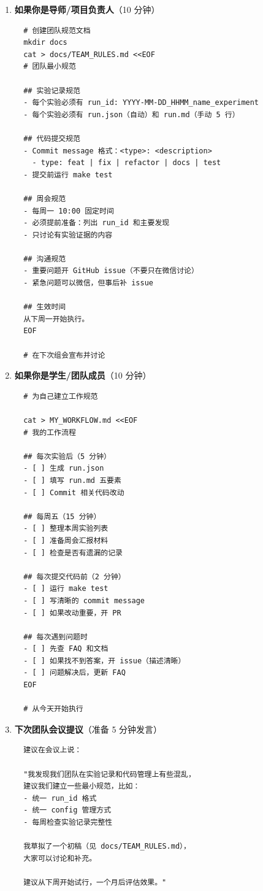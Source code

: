 \begin{enumerate}
  \item \textbf{如果你是导师/项目负责人}（10 分钟）

  \begin{verbatim}
  # 创建团队规范文档
  mkdir docs
  cat > docs/TEAM_RULES.md <<EOF
  # 团队最小规范

  ## 实验记录规范
  - 每个实验必须有 run_id: YYYY-MM-DD_HHMM_name_experiment
  - 每个实验必须有 run.json（自动）和 run.md（手动 5 行）

  ## 代码提交规范
  - Commit message 格式：<type>: <description>
    - type: feat | fix | refactor | docs | test
  - 提交前运行 make test

  ## 周会规范
  - 每周一 10:00 固定时间
  - 必须提前准备：列出 run_id 和主要发现
  - 只讨论有实验证据的内容

  ## 沟通规范
  - 重要问题开 GitHub issue（不要只在微信讨论）
  - 紧急问题可以微信，但事后补 issue

  ## 生效时间
  从下周一开始执行。
  EOF

  # 在下次组会宣布并讨论
  \end{verbatim}

  \item \textbf{如果你是学生/团队成员}（10 分钟）

  \begin{verbatim}
  # 为自己建立工作规范

  cat > MY_WORKFLOW.md <<EOF
  # 我的工作流程

  ## 每次实验后（5 分钟）
  - [ ] 生成 run.json
  - [ ] 填写 run.md 五要素
  - [ ] Commit 相关代码改动

  ## 每周五（15 分钟）
  - [ ] 整理本周实验列表
  - [ ] 准备周会汇报材料
  - [ ] 检查是否有遗漏的记录

  ## 每次提交代码前（2 分钟）
  - [ ] 运行 make test
  - [ ] 写清晰的 commit message
  - [ ] 如果改动重要，开 PR

  ## 每次遇到问题时
  - [ ] 先查 FAQ 和文档
  - [ ] 如果找不到答案，开 issue（描述清晰）
  - [ ] 问题解决后，更新 FAQ
  EOF

  # 从今天开始执行
  \end{verbatim}

  \item \textbf{下次团队会议提议}（准备 5 分钟发言）

  \begin{verbatim}
  建议在会议上说：

  "我发现我们团队在实验记录和代码管理上有些混乱，
  建议我们建立一些最小规范，比如：
  - 统一 run_id 格式
  - 统一 config 管理方式
  - 每周检查实验记录完整性

  我草拟了一个初稿（见 docs/TEAM_RULES.md），
  大家可以讨论和补充。

  建议从下周开始试行，一个月后评估效果。"
  \end{verbatim}
\end{enumerate}

